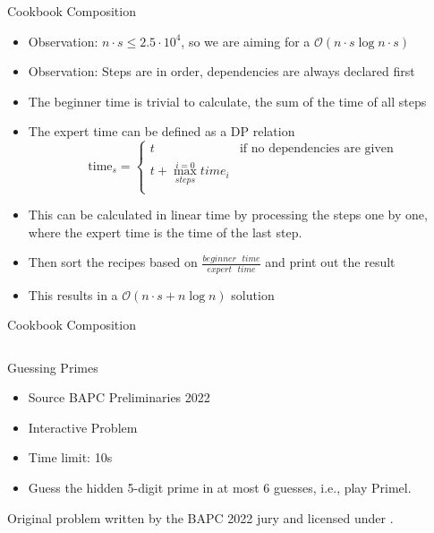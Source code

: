 \documentclass[11pt,pdf, aspectratio=169]{beamer}
\begin{document}
  \begin{frame}{Cookbook Composition}
    \begin{itemize}
      \item Observation: $n\cdot s \leq 2.5\cdot10^4$, so we are aiming for a $\mathcal{O}(n\cdot s \log{n\cdot s})$
      \item Observation: Steps are in order, dependencies are always declared first
      \item The beginner time is trivial to calculate, the sum of the time of all steps
      \item The expert time can be defined as a DP relation\\
      \[\text{time}_s = \begin{cases}
                          t & \text{if no dependencies are given}\\
                          t + \max\limits_{steps}^{i=0} time_i & \\
      \end{cases}\]
      \item This can be calculated in linear time by processing the steps one by one, where the expert time is the time of the last step.
      \item Then sort the recipes based on $\frac{beginner\text{ }time}{expert\text{ }time}$ and print out the result
      \item This results in a $\mathcal{O}(n\cdot s + n \log n)$ solution
    \end{itemize}
  \end{frame}
  \begin{frame}[containsverbatim]{Cookbook Composition}
    \inputminted{python}{code/session-4/dapc-c.py}
  \end{frame}
  \begin{frame}{Guessing Primes}
    \begin{itemize}
      \item Source BAPC Preliminaries 2022
      \item Interactive Problem
      \item Time limit: 10s
      \item Guess the hidden 5-digit prime in at most 6 guesses, i.e., play Primel.

    \end{itemize}
    Original problem written by the BAPC 2022 jury and licensed under \doclicenseLongNameRef.

    \doclicenseImage
  \end{frame}
\end{document}
